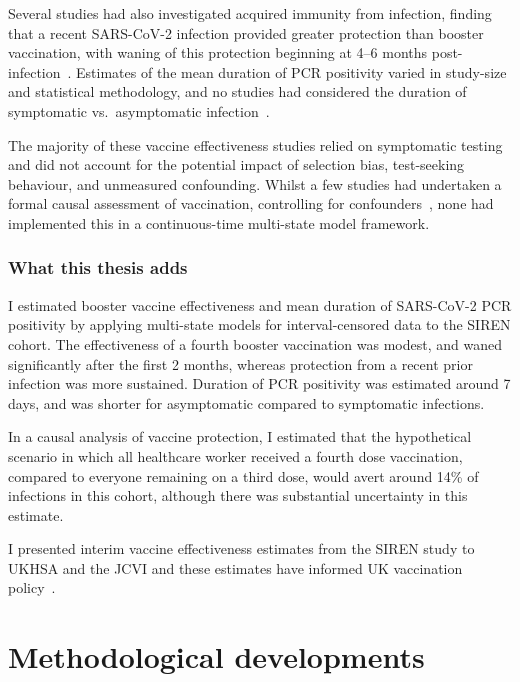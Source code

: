 Several studies had also investigated acquired immunity from infection, finding that a recent SARS-CoV-2 infection provided greater protection than booster vaccination, with waning of this protection beginning at 4--6 months post-infection~\parencite{Huiberts2023-kq, Auvigne2023-ay}. Estimates of the mean duration of PCR positivity varied in study-size and statistical methodology, and no studies had considered the duration of symptomatic vs.\ asymptomatic infection~\parencite{Boucau2022-it, Hay2022-sg, Kojima2022-vh}.

The majority of these vaccine effectiveness studies relied on symptomatic testing and did not account for the potential impact of selection bias, test-seeking behaviour, and unmeasured confounding. Whilst a few studies had undertaken a formal causal assessment of vaccination, controlling for confounders~\parencite{Dagan2021-ow, Hulme2023-fw}, none had implemented this in a continuous-time multi-state model framework.

\subsubsection{What this thesis adds}

I estimated booster vaccine effectiveness and mean duration of SARS-CoV-2 PCR positivity by applying multi-state models for interval-censored data to the SIREN cohort. The effectiveness of a fourth booster vaccination was modest, and waned significantly after the first 2 months, whereas protection from a recent prior infection was more sustained. Duration of PCR positivity was estimated around 7 days, and was shorter for asymptomatic compared to symptomatic infections.

In a causal analysis of vaccine protection, I estimated that the hypothetical scenario in which all healthcare worker received a fourth dose vaccination, compared to everyone remaining on a third dose, would avert around 14\% of infections in this cohort, although there was substantial uncertainty in this estimate.

I presented interim vaccine effectiveness estimates from the SIREN study to UKHSA and the JCVI and these estimates have informed UK vaccination policy~\parencite{Department-of-Health-and-Social-Care2023-um}.

\section{Methodological developments}


